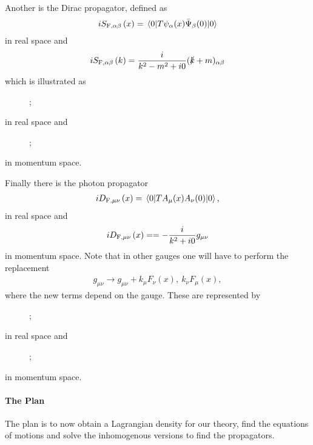 Another is the Dirac propagator, defined as
\begin{align*}
	iS_{\text{F}, \alpha\beta}\left(x\right) = \expval{\ensuremath{T\psi_{\alpha}(x)\bar{\Psi}_{\beta}(0)}}{0}
\end{align*}
in real space and
\begin{align*}
	iS_{\text{F}, \alpha\beta}\left(k\right) = \frac{i}{k^{2} - m^{2} + i0}(\slashed{k} + m)_{\alpha\beta}
\end{align*}
which is illustrated as
\begin{figure}[!ht]
	\centering
	;
\end{figure}
in real space and
\begin{figure}[!ht]
	\centering
	;
\end{figure}
in momentum space.

Finally there is the photon propagator
\begin{align*}
	iD_{\text{F}, \mu\nu}\left(x\right) = \expval{\ensuremath{TA_{\mu}(x)A_{\nu}(0)}}{0},
\end{align*}
in real space and
\begin{align}
	iD_{\text{F}, \mu\nu}\left(x\right) = = -\frac{i}{k^{2} + i0}g_{\mu\nu}
\end{align}
in momentum space. Note that in other gauges one will have to perform the replacement
\begin{align*}
	g_{\mu\nu} \to g_{\mu\nu} + k_{\mu}F_{\nu}(x),\ k_{\nu}F_{\mu}(x),
\end{align*}
where the new terms depend on the gauge. These are represented by
\begin{figure}[!ht]
	\centering
	;
\end{figure}
in real space and
\begin{figure}[!ht]
	\centering
	;
\end{figure}
in momentum space.

\paragraph{The Plan}
The plan is to now obtain a Lagrangian density for our theory, find the equations of motions and solve the inhomogenous versions to find the propagators.

